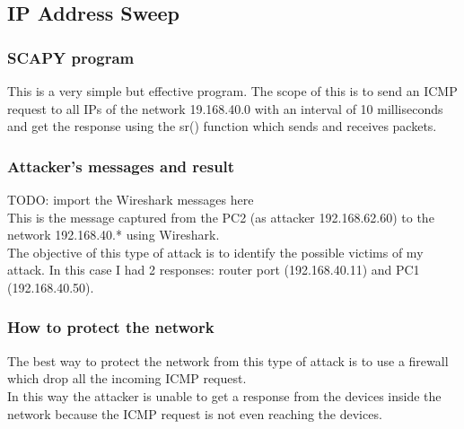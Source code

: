 \subsection{IP Address Sweep}
\subsubsection{SCAPY program}

This is a very simple but effective program. The scope of this is to send an ICMP request to all IPs of the network 19.168.40.0 with an interval of 10 milliseconds and get the response using the sr() function which sends and receives packets.\par

\subsubsection{Attacker’s messages and result}

{\huge{TODO: import the Wireshark messages here}}\\

This is the message captured from the PC2 (as attacker 192.168.62.60) to the network 192.168.40.* using Wireshark.\\
The objective of this type of attack is to identify the possible victims of my attack. In this case I had 2 responses: router port (192.168.40.11) and PC1 (192.168.40.50).\par

\subsubsection{How to protect the network}
The best way to protect the network from this type of attack is to use a firewall which drop all the incoming ICMP request.\\
In this way the attacker is unable to get a response from the devices inside the network because the ICMP request is not even reaching the devices.\par
